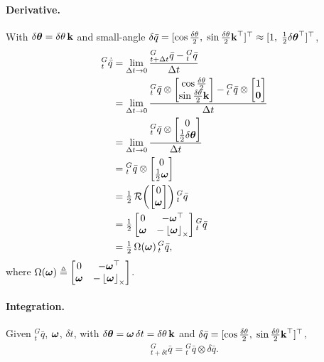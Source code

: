 \paragraph{Derivative.} With $\delta\boldsymbol{\mathbf{\theta}} = \delta\theta\,\boldsymbol{\mathbf{k}}$ and small-angle $\delta\bar{q} = [\cos\tfrac{\delta\theta}{2},\;\sin\tfrac{\delta\theta}{2}\boldsymbol{\mathbf{k}}^\top]^\top \approx [1,\;\tfrac12\delta\boldsymbol{\mathbf{\theta}}^\top]^\top$,
\begin{align}
{}^{G}_{t}\dot{\bar{q}}
&= \lim_{\Delta t\to0}\frac{{}^{G}_{t+\Delta t}\bar{q} - {}^{G}_{t}\bar{q}}{\Delta t} \\
&= \lim_{\Delta t\to0}\frac{{}^{G}_{t}\bar{q}\otimes\begin{bmatrix}\cos\tfrac{\delta\theta}{2}\\ \sin\tfrac{\delta\theta}{2}\boldsymbol{\mathbf{k}}\end{bmatrix} - {}^{G}_{t}\bar{q}\otimes\begin{bmatrix}1\\ \boldsymbol{\mathbf{0}}\end{bmatrix}}{\Delta t} \\
&= \lim_{\Delta t\to0}\frac{{}^{G}_{t}\bar{q}\otimes\begin{bmatrix}0\\ \tfrac12\delta\boldsymbol{\mathbf{\theta}}\end{bmatrix}}{\Delta t} \\
&= {}^{G}_{t}\bar{q}\otimes\begin{bmatrix}0\\ \tfrac12\boldsymbol{\mathbf{\omega}}\end{bmatrix} \\
&= \tfrac12\,\mathcal{R}\!\left(\begin{bmatrix}0\\ \boldsymbol{\mathbf{\omega}}\end{bmatrix}\right){}^{G}_{t}\bar{q} \\
&= \tfrac12\begin{bmatrix}0 & -\boldsymbol{\mathbf{\omega}}^\top\\ \boldsymbol{\mathbf{\omega}} & -\left\lfloor\boldsymbol{\mathbf{\omega}}\right\rfloor_{\times}\end{bmatrix}{}^{G}_{t}\bar{q} \\
&= \tfrac12\,\Omega(\boldsymbol{\mathbf{\omega}})\,{}^{G}_{t}\bar{q},
\end{align}
where $\Omega(\boldsymbol{\mathbf{\omega}}) \triangleq \begin{bmatrix} 0 & -\boldsymbol{\mathbf{\omega}}^\top \\ \boldsymbol{\mathbf{\omega}} & -\left\lfloor\boldsymbol{\mathbf{\omega}}\right\rfloor_{\times} \end{bmatrix}$.

\paragraph{Integration.} Given ${}^{G}_{t}\bar{q}$, $\boldsymbol{\mathbf{\omega}}$, $\delta t$, with $\delta\boldsymbol{\mathbf{\theta}} = \boldsymbol{\mathbf{\omega}}\,\delta t = \delta\theta\,\boldsymbol{\mathbf{k}}$ and $\delta\bar{q} = [\cos\tfrac{\delta\theta}{2},\;\sin\tfrac{\delta\theta}{2}\boldsymbol{\mathbf{k}}^\top]^\top$,
\begin{align}
{}^{G}_{t+\delta t}\bar{q} = {}^{G}_{t}\bar{q}\otimes\delta\bar{q}.
\end{align}

